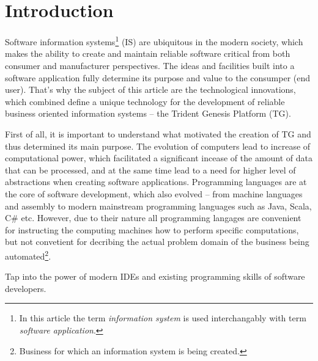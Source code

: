 \section{Introduction}\label{sec:01}
  Software information systems\footnote{In this article the term \emph{information system} is used interchangably with term \emph{software application}.} (IS) are ubiquitous in the modern society, which makes the ability to create and maintain reliable software critical from both consumer and manufacturer perspectives.
  The ideas and facilities built into a software application fully determine its purpose and value to the consumper (end user).
  That's why the subject of this article are the technological innovations, which combined define a unique technology for the development of reliable business oriented information systems -- the Trident Genesis Platform (TG).

  First of all, it is important to understand what motivated the creation of TG and thus determined its main purpose.
  The evolution of computers lead to increase of computational power, which facilitated a significant incease of the amount of data that can be processed, and at the same time lead to a need for higher level of abstractions when creating software applications.
  Programming languages are at the core of software development, which also evolved -- from machine languages and assembly to modern mainstream programming languages such as Java, Scala, C\# etc.
  However, due to their nature all programming langages are convenient for instructing the computing machines how to perform specific computations, but not convetient for decribing the actual problem domain of the business being automated\footnote{Business for which an information system is being created.}.
  
   
  Tap into the power of modern IDEs and existing programming skills of software developers.

 
